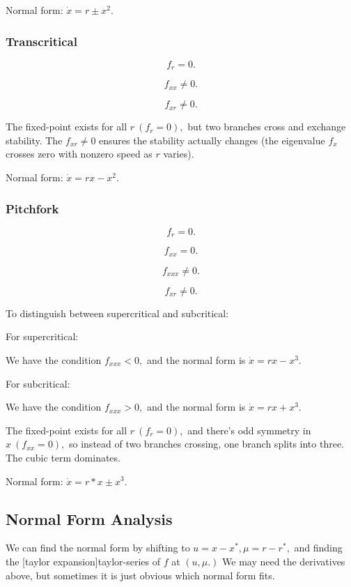 \documentclass{article}
\begin{document}
Normal form: $\dot{x} = r \pm x^2. $

\subsubsection{Transcritical}

\[ f_r = 0. \]

\[ f_{xx} \neq 0. \]

\[ f_{xr} \neq 0. \]

\begin{intuition}
The \@{fixed-point} exists for all $r  ~ (f_r = 0),$ but two branches cross and exchange stability. The $f_{xr} \neq 0$ ensures the stability actually changes (the \@{eigenvalue} $f_x$ crosses zero with nonzero speed as $r$ varies).
\end{intuition}

Normal form: $\dot{x} = r x - x^2.$

\subsubsection{Pitchfork}

\[ f_r = 0. \]

\[ f_{xx} = 0. \]

\[ f_{xxx} \neq 0. \]

\[ f_{xr} \neq 0. \]

To distinguish between supercritical and subcritical:

For supercritical:

We have the condition $f_{xxx}  < 0,$ and the normal form is $\dot{x} = r x - x^3.$

For subcritical:

We have the condition $f_{xxx} > 0,$ and the normal form is $\dot{x} = r x + x^3.$

The \@{fixed-point} exists for all $r ~ (f_r = 0),$ and there's odd symmetry in $x ~ (f_{xx} = 0),$ so instead of two branches crossing, one branch splits into three. The cubic term dominates.

Normal form: $\dot{x} = r * x \pm x^3.$

\subsection{Normal Form Analysis}

We can find the normal form by shifting to $u = x - x^*, \mu = r - r^*,$ and finding the \@[taylor expansion]{taylor-series} of $f$ at $(u, \mu.)$ We may need the derivatives above, but sometimes it is just obvious which normal form fits.
\end{document}
